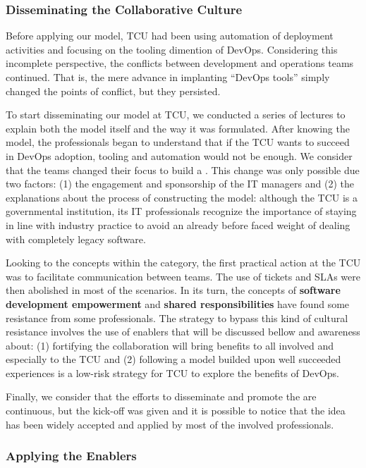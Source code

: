 \subsubsection{Disseminating the Collaborative Culture}

Before applying our model, TCU had been using automation of deployment
activities and focusing on the tooling dimention of DevOps.
Considering this incomplete perspective, the conflicts between
development and operations teams continued. That is, the mere advance in
implanting ``DevOps tools'' simply changed the points of conflict, but they
persisted.

{
\color{blue}
To start disseminating our model at TCU, we conducted a series of lectures to
explain both the model itself and the way it was formulated. After knowing the
model, the professionals began to understand that if the TCU wants to succeed in
DevOps adoption, tooling and automation would not be enough. We consider that
the teams changed their focus to build a \cc. This change was only possible due
two factors: (1) the engagement and sponsorship of the IT managers and (2) the
explanations about the process of constructing the model: although the TCU is a
governmental institution, its IT professionals recognize the importance of
staying in line with industry practice to avoid an already before faced weight
of dealing with completely legacy software.

Looking to the concepts within the \cc category, the first practical action at
the TCU was to facilitate communication between teams. The use of tickets and
SLAs were then abolished in most of the scenarios. In its turn, the concepts of
\textbf{software development empowerment} and \textbf{shared responsibilities}
have found some resistance from some professionals. The strategy to bypass this
kind of cultural resistance involves the use of enablers that will be discussed
bellow and awareness about: (1) fortifying the collaboration will bring benefits
to all involved and especially to the TCU and (2) following a model builded upon
well succeeded experiences is a low-risk strategy for TCU to explore the
benefits of DevOps.

Finally, we consider that the efforts to disseminate and promote the \cc are
continuous, but the kick-off was given and it is possible to notice that the
idea has been widely accepted and applied by most of the involved professionals.

}

\subsubsection{Applying the Enablers}

